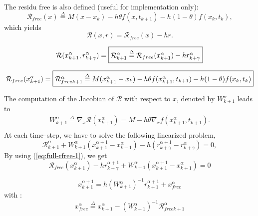 The residu free is also defined (useful for implementation only):
\[\mathcal R _{free}(x) \stackrel{\Delta}{=}  M(x - x_{k}) -h\theta f( x , t_{k+1}) - h(1-\theta)f(x_k,t_k),\]
which yields
\[\mathcal R (x,r) = \mathcal R _{free}(x)   - h r .\]

\begin{equation}
  \mathcal R (x^{\alpha}_{k+1},r^{\alpha}_{k+\gamma}) = \fbox{$\mathcal R^{\alpha}_{k+1} \stackrel{\Delta}{=}  \mathcal R_{free}(x^{\alpha}_{k+1} )  - h r^{\alpha}_{k+\gamma}$}\label{eq:full-rfree-1}
\end{equation}

\[  \mathcal R
_{free}(x^{\alpha}_{k+1} )=\fbox{$ \mathcal R _{free k+1} ^{\alpha} \stackrel{\Delta}{=}  M(x^{\alpha}_{k+1} - x_{k}) -h\theta f( x^{\alpha}_{k+1} , t_{k+1}) - h(1-\theta)f(x_k,t_k)$}\]
 
The computation of the Jacobian of $\mathcal R$ with respect to $x$, denoted by $   W^{\alpha}_{k+1}$ leads to 
\begin{equation}
   \label{eq:full-NL9}
   \begin{array}{l}
    W^{\alpha}_{k+1} \stackrel{\Delta}{=} \nabla_{x} \mathcal R (x^{\alpha}_{k+1})= M - h  \theta \nabla_{x} f(  x^{\alpha}_{k+1}, t_{k+1} ).\\
 \end{array}
\end{equation}
At each time--step, we have to solve the following linearized problem,
\begin{equation}
   \label{eq:full-NL10}
    \mathcal R^{\alpha}_{k+1} + W^{\alpha}_{k+1} (x^{\alpha+1}_{k+1} -
    x^{\alpha}_{k+1}) - h  (r^{\alpha+1}_{k+\gamma} - r^{\alpha}_{k+\gamma} )  =0 ,
\end{equation}
By using (\ref{eq:full-rfree-1}), we get
\begin{equation}
  \label{eq:full-rfree-2}
  \mathcal R _{free}(x^{\alpha}_{k+1})  - h  r^{\alpha+1}_{k+\gamma}   + W^{\alpha}_{k+1} (x^{\alpha+1}_{k+1} -
    x^{\alpha}_{k+1})  =0 
\end{equation}

{
  \begin{equation}
    \boxed{ x^{\alpha+1}_{k+1} = h(W^{\alpha}_{k+1})^{-1}r^{\alpha+1}_{k+1} +x^\alpha_{free}}
  \end{equation}
}
with :
\begin{equation}
  \boxed{x^\alpha_{free}\stackrel{\Delta}{=}x^{\alpha}_{k+1}-(W^{\alpha}_{k+1})^{-1}\mathcal R_{freek+1}^{\alpha} \label{eq:full-rfree-12}}
\end{equation}

